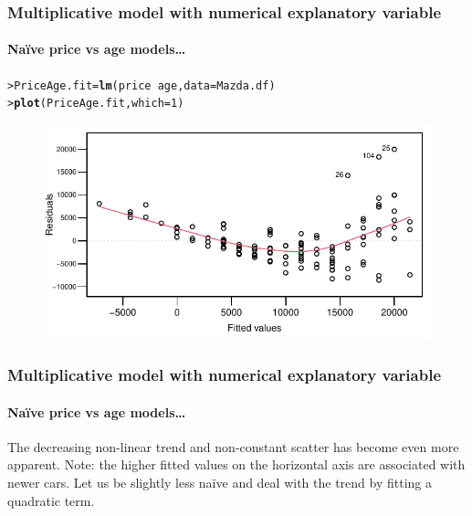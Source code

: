 \documentclass{beamer}\usepackage[]{graphicx}\usepackage[]{xcolor}
\makeatletter
\newcommand{\hlnum}[1]{\textcolor[rgb]{0.686,0.059,0.569}{#1}}%
\newcommand{\hlopt}[1]{\textcolor[rgb]{0,0,0}{#1}}%
\newcommand{\hlstd}[1]{\textcolor[rgb]{0.345,0.345,0.345}{#1}}%
\newcommand{\hlkwb}[1]{\textcolor[rgb]{0.69,0.353,0.396}{#1}}%
\newcommand{\hlkwc}[1]{\textcolor[rgb]{0.333,0.667,0.333}{#1}}%
\newcommand{\hlkwd}[1]{\textcolor[rgb]{0.737,0.353,0.396}{\textbf{#1}}}%
\newenvironment{kframe}{%
 \def\at@end@of@kframe{}%
 \ifinner\ifhmode%
  \def\at@end@of@kframe{\end{minipage}}%
  \begin{minipage}{\columnwidth}%
 \fi\fi%
 \def\FrameCommand##1{\hskip\@totalleftmargin \hskip-\fboxsep
 \colorbox{shadecolor}{##1}\hskip-\fboxsep
     \hskip-\linewidth \hskip-\@totalleftmargin \hskip\columnwidth}%
 \MakeFramed {\advance\hsize-\width
   \@totalleftmargin\z@ \linewidth\hsize
   \@setminipage}}%
 {\par\unskip\endMakeFramed%
 \at@end@of@kframe}
\newenvironment{knitrout}{}{} %
\makeatother
\begin{document}
\begin{frame}[fragile]
\frametitle{Multiplicative model with numerical explanatory variable}
\framesubtitle{Na\"ive price vs age models\ldots}

\begin{knitrout}\scriptsize
{}\color{fgcolor}\begin{kframe}
\begin{alltt}
\hlstd{> }\hlstd{PriceAge.fit}\hlkwb{=}\hlkwd{lm}\hlstd{(price}\hlopt{~}\hlstd{age,} \hlkwc{data}\hlstd{=Mazda.df)}
\hlstd{> }\hlkwd{plot}\hlstd{(PriceAge.fit,}\hlkwc{which}\hlstd{=}\hlnum{1}\hlstd{)}
\end{alltt}
\end{kframe}
\end{knitrout}



\begin{figure}
  \centering
  \includegraphics{figure/RC-H06-024}
\end{figure}

\end{frame}


\begin{frame}[fragile]
\frametitle{Multiplicative model with numerical explanatory variable}
\framesubtitle{Na\"ive price vs age models\ldots}
The decreasing non-linear trend and non-constant scatter has become even more apparent.
Note: the higher fitted values on the horizontal axis are associated with newer cars. 
Let us be slightly less na\"ive and deal with the trend by fitting a quadratic term.

\end{frame}
\end{document}
